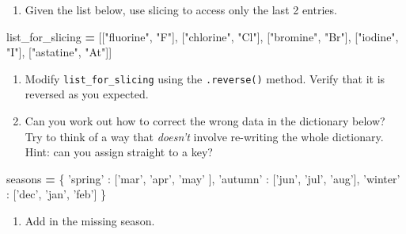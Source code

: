 \documentclass[]{book}
\newenvironment{Shaded}{\begin{snugshade}}{\end{snugshade}}
\newcommand{\NormalTok}[1]{#1}
\newcommand{\OperatorTok}[1]{\textcolor[rgb]{0.81,0.36,0.00}{\textbf{#1}}}
\newcommand{\StringTok}[1]{\textcolor[rgb]{0.31,0.60,0.02}{#1}}
\providecommand{\tightlist}{%
  \setlength{\itemsep}{0pt}\setlength{\parskip}{0pt}}
\theoremstyle{definition}
\theoremstyle{definition}
\theoremstyle{definition}
\theoremstyle{remark}
\begin{document}
\begin{enumerate}
\def\labelenumi{\arabic{enumi}.}
\tightlist
\item
  Given the list below, use slicing to access only the last 2 entries.
\end{enumerate}

\begin{Shaded}
\begin{Highlighting}[]
\NormalTok{list_for_slicing }\OperatorTok{=}\NormalTok{ [[}\StringTok{"fluorine"}\NormalTok{, }\StringTok{"F"}\NormalTok{], }
\NormalTok{                    [}\StringTok{"chlorine"}\NormalTok{, }\StringTok{"Cl"}\NormalTok{], }
\NormalTok{                    [}\StringTok{"bromine"}\NormalTok{, }\StringTok{"Br"}\NormalTok{], }
\NormalTok{                    [}\StringTok{"iodine"}\NormalTok{, }\StringTok{"I"}\NormalTok{], }
\NormalTok{                    [}\StringTok{"astatine"}\NormalTok{, }\StringTok{"At"}\NormalTok{]]}
\end{Highlighting}
\end{Shaded}

\begin{enumerate}
\def\labelenumi{\arabic{enumi}.}
\setcounter{enumi}{1}
\item
  Modify \texttt{list\_for\_slicing} using the \texttt{.reverse()}
  method. Verify that it is reversed as you expected.
\item
  Can you work out how to correct the wrong data in the dictionary
  below? Try to think of a way that \emph{doesn't} involve re-writing
  the whole dictionary. Hint: can you assign straight to a key?
\end{enumerate}

\begin{Shaded}
\begin{Highlighting}[]
\NormalTok{seasons }\OperatorTok{=}\NormalTok{ \{}
  \StringTok{'spring'}\NormalTok{ : [}\StringTok{'mar'}\NormalTok{, }\StringTok{'apr'}\NormalTok{, }\StringTok{'may'}\NormalTok{ ],}
  \StringTok{'autumn'}\NormalTok{ : [}\StringTok{'jun'}\NormalTok{, }\StringTok{'jul'}\NormalTok{, }\StringTok{'aug'}\NormalTok{],}
  \StringTok{'winter'}\NormalTok{ : [}\StringTok{'dec'}\NormalTok{, }\StringTok{'jan'}\NormalTok{, }\StringTok{'feb'}\NormalTok{]}
\NormalTok{\}}
\end{Highlighting}
\end{Shaded}

\begin{enumerate}
\def\labelenumi{\arabic{enumi}.}
\setcounter{enumi}{3}
\tightlist
\item
  Add in the missing season.
\end{enumerate}
\end{document}
